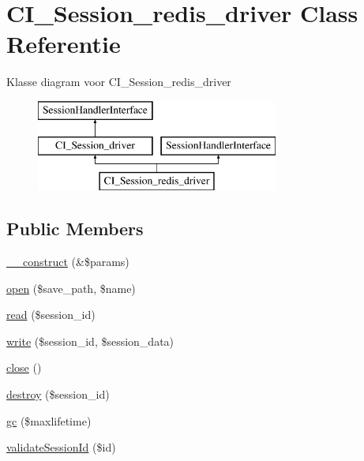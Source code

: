 \hypertarget{class_c_i___session__redis__driver}{}\section{C\+I\+\_\+\+Session\+\_\+redis\+\_\+driver Class Referentie}
\label{class_c_i___session__redis__driver}
Klasse diagram voor C\+I\+\_\+\+Session\+\_\+redis\+\_\+driver\begin{figure}[H]
\begin{center}
\leavevmode
\includegraphics[height=3.000000cm]{class_c_i___session__redis__driver}
\end{center}
\end{figure}
\subsection*{Public Members}
\begin{DoxyCompactItemize}
\item 
\mbox{\hyperlink{class_c_i___session__redis__driver_ac1669c73d53d6f16cf5459a1e84d39c8}{\+\_\+\+\_\+construct}} (\&\$params)
\item 
\mbox{\hyperlink{class_c_i___session__redis__driver_a614b5cf3840833913c7a73260ed28e02}{open}} (\$save\+\_\+path, \$name)
\item 
\mbox{\hyperlink{class_c_i___session__redis__driver_a5bbf84ebf657be4eaccc0582377c76bf}{read}} (\$session\+\_\+id)
\item 
\mbox{\hyperlink{class_c_i___session__redis__driver_ad9d124885be93668f1dbf6aace5964f5}{write}} (\$session\+\_\+id, \$session\+\_\+data)
\item 
\mbox{\hyperlink{class_c_i___session__redis__driver_aa69c8bf1f1dcf4e72552efff1fe3e87e}{close}} ()
\item 
\mbox{\hyperlink{class_c_i___session__redis__driver_aaec5812f6b4eb6835f88d3baa06a002a}{destroy}} (\$session\+\_\+id)
\item 
\mbox{\hyperlink{class_c_i___session__redis__driver_a57aff7ee0656d8aa75d545fb8b3ae35d}{gc}} (\$maxlifetime)
\item 
\mbox{\hyperlink{class_c_i___session__redis__driver_a7bee5f3a24cb93e5a7fc371e05046f20}{validate\+Session\+Id}} (\$id)
\end{DoxyCompactItemize}
